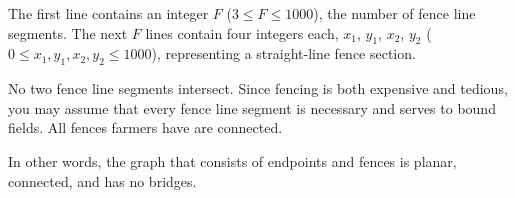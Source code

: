 

The first line contains an integer $F$ ($3 \leq F \leq 1000$), the number of fence line segments.
The next $F$ lines contain four integers each, $x_1$, $y_1$, $x_2$,
$y_2$ ($0 \leq x_1, y_1, x_2, y_2 \leq 1000$), representing a straight-line fence section.

No two fence line segments intersect. Since fencing is both expensive and tedious, you may assume that every
fence line segment is necessary and serves to bound fields.
All fences farmers have are connected.

In other words, the graph that consists of endpoints and fences is planar, connected, and has no bridges.

